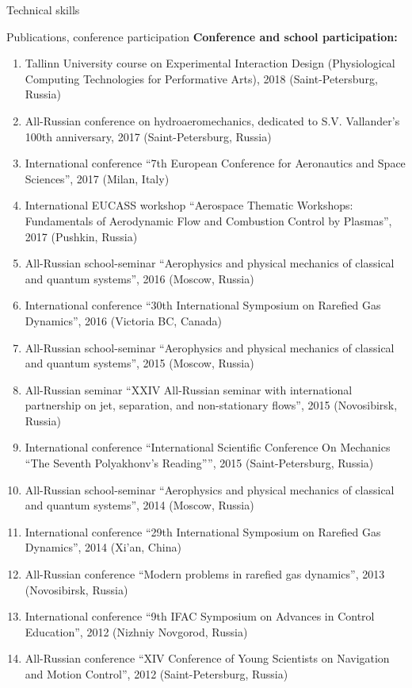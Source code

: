 \documentclass{resume} %
\begin{document}
\begin{rSection}{Technical skills}
\begin{rSection}{Publications, conference participation}
{\bf Conference and school participation:}

\begin{enumerate}
    \item Tallinn University course on Experimental Interaction Design (Physiological Computing Technologies for Performative Arts), 2018 (Saint-Petersburg, Russia)
    \item All-Russian conference on hydroaeromechanics, dedicated to S.V. Vallander's 100th anniversary, 2017 (Saint-Petersburg, Russia)
    \item International conference ``7th European Conference for Aeronautics and Space Sciences'', 2017 (Milan, Italy)
    \item International EUCASS workshop ``Aerospace Thematic Workshops: Fundamentals of Aerodynamic Flow and Combustion Control by Plasmas'', 2017 (Pushkin, Russia)
    \item All-Russian school-seminar ``Aerophysics and physical mechanics of classical and quantum systems'', 2016 (Moscow, Russia)
    \item International conference ``30th International Symposium on Rarefied Gas Dynamics'', 2016 (Victoria BC, Canada)
    \item All-Russian school-seminar ``Aerophysics and physical mechanics of classical and quantum systems'', 2015 (Moscow, Russia)
    \item All-Russian seminar ``XXIV All-Russian seminar with international partnership on jet, separation, and non-stationary flows'', 2015 (Novosibirsk, Russia)
    \item International conference ``International Scientific Conference On Mechanics ``The Seventh Polyakhonv's Reading'''', 2015 (Saint-Petersburg, Russia)
    \item All-Russian school-seminar ``Aerophysics and physical mechanics of classical and quantum systems'', 2014 (Moscow, Russia)
    \item International conference ``29th International Symposium on Rarefied Gas Dynamics'', 2014 (Xi'an, China)
    \item All-Russian conference ``Modern problems in rarefied gas dynamics'', 2013 (Novosibirsk, Russia)
    \item International conference ``9th IFAC Symposium on Advances in Control Education'', 2012 (Nizhniy Novgorod, Russia)
    \item All-Russian conference ``XIV Conference of Young Scientists on Navigation and Motion Control'', 2012 (Saint-Petersburg, Russia)
\end{enumerate}


\end{rSection}
\end{rSection}
\end{document}
